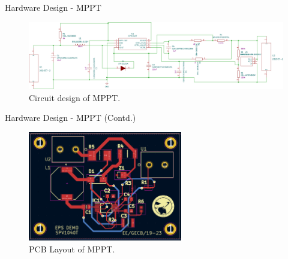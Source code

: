 \documentclass[aspectratio=169]{beamer}
\begin{document}
	
	\begin{frame}{Hardware Design - MPPT }
		\begin{figure}[h]
			\centering
			\includegraphics[width=1\textwidth]{diag/MpptDemoBoard.pdf}
			\caption{Circuit design of MPPT.}
			\label{fig:mesh1}
		\end{figure}
	\end{frame}

	\begin{frame}{Hardware Design - MPPT (Contd.) }
		\begin{figure}[h]
			\centering
			\includegraphics[width=0.6\textwidth]{diag/MpptDemopcb.png}
			\caption{PCB Layout of MPPT.}
			\label{fig:mesh1}
		\end{figure}
	\end{frame}
\end{document}
